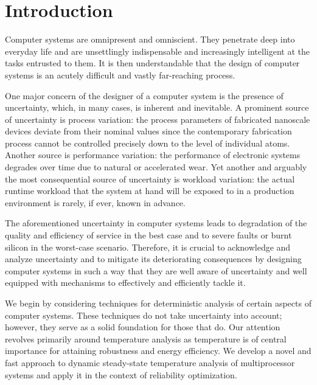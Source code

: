 \chapter{Introduction}
Computer systems are omnipresent and omniscient. They penetrate deep into
everyday life and are unsettlingly indispensable and increasingly intelligent at
the tasks entrusted to them. It is then understandable that the design of
computer systems is an acutely difficult and vastly far-reaching process.

One major concern of the designer of a computer system is the presence of
uncertainty, which, in many cases, is inherent and inevitable. A prominent
source of uncertainty is process variation: the process parameters of fabricated
nanoscale devices deviate from their nominal values since the contemporary
fabrication process cannot be controlled precisely down to the level of
individual atoms. Another source is performance variation: the performance of
electronic systems degrades over time due to natural or accelerated wear. Yet
another and arguably the most consequential source of uncertainty is workload
variation: the actual runtime workload that the system at hand will be exposed
to in a production environment is rarely, if ever, known in advance.

The aforementioned uncertainty in computer systems leads to degradation of the
quality and efficiency of service in the best case and to severe faults or burnt
silicon in the worst-case scenario. Therefore, it is crucial to acknowledge and
analyze uncertainty and to mitigate its deteriorating consequences by designing
computer systems in such a way that they are well aware of uncertainty and well
equipped with mechanisms to effectively and efficiently tackle it.

We begin by considering techniques for deterministic analysis of certain aspects
of computer systems. These techniques do not take uncertainty into account;
however, they serve as a solid foundation for those that do. Our attention
revolves primarily around temperature analysis as temperature is of central
importance for attaining robustness and energy efficiency. We develop a novel
and fast approach to dynamic steady-state temperature analysis of multiprocessor
systems and apply it in the context of reliability optimization.

